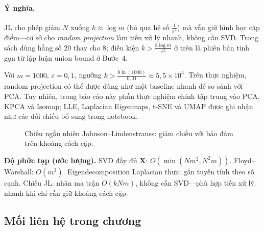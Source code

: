 \paragraph{Ý nghĩa.}
JL cho phép giảm $N$ xuống $k \approx \log m$ (bỏ qua hệ số $\frac{1}{\varepsilon^2}$) mà vẫn giữ hình học cặp điểm---cơ sở cho \emph{random projection} làm tiền xử lý nhanh, không cần SVD. Trong sách \cite{mohri2018foundations} dùng hằng số $20$ thay cho $8$; điều kiện $k > \frac{8\log m}{\varepsilon^2}$ ở trên là phiên bản tinh gọn từ lập luận union bound ở Bước~4.

\begin{example}
Với $m = 1000$, $\varepsilon = 0{,}1$, ngưỡng $k > \frac{8\ln(1000)}{0{,}01} \approx 5{,}5 \times 10^3$. Trên thực nghiệm, random projection có thể được dùng như một baseline nhanh để so sánh với PCA. Tuy nhiên, trong báo cáo này phần thực nghiệm chính tập trung vào PCA, KPCA và Isomap; LLE, Laplacian Eigenmaps, t-SNE và UMAP được ghi nhận như các đối chiếu bổ sung trong notebook.
\end{example}

\begin{figure}[H]
\centering
{}
\caption{Chiếu ngẫu nhiên Johnson--Lindenstrauss: giảm chiều với bảo đảm trên khoảng cách cặp.}
\label{fig:jl-projection}
\end{figure}

\begin{extension}
\textbf{Độ phức tạp (ước lượng).}
SVD đầy đủ $\mathbf{X}$: $O(\min(Nm^2, N^2 m))$. Floyd--Warshall: $O(m^3)$. Eigendecomposition Laplacian thưa: gần tuyến tính theo số cạnh. Chiếu JL: nhân ma trận $O(kNm)$, không cần SVD---phù hợp tiền xử lý nhanh khi chỉ cần giữ khoảng cách cặp.
\end{extension}

\subsection{Mối liên hệ trong chương}


